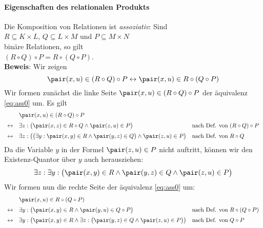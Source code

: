\paragraph{Eigenschaften des relationalen Produkts}
Die Komposition von Relationen ist \emph{assoziativ}:  Sind \\[0.2cm]
\hspace*{1.3cm} $R \subseteq K \times L$, \quad $Q \subseteq L \times M$ \quad und \quad 
                $P \subseteq M \times N$ \\[0.2cm]
bin\"{a}re Relationen, so gilt \\[0.2cm]
\hspace*{1.3cm} $(R \circ Q) \circ P = R \circ (Q \circ P)$. \\[0.2cm]
\textbf{Beweis}:  Wir zeigen
\begin{equation}
  \label{eq:ass0}
   \pair(x,u) \in (R \circ Q) \circ P \leftrightarrow \pair(x,u) \in R \circ (Q \circ P)   
\end{equation}
Wir formen zun\"{a}chst die linke Seite $\pair(x,u) \in (R \circ Q) \circ P$ der \"{a}quivalenz
\ref{eq:ass0} um.  Es gilt
\[
\begin{array}{cll}
                  & \pair(x,u) \in (R \circ Q) \circ P \\[0.2cm]
  \leftrightarrow & \exists z: \bigl(\pair(x,z) \in R \circ Q \wedge \pair(z,u) \in P\bigr) &
                    \mbox{nach Def. von}\; (R \circ Q) \circ P \\[0.2cm]
  \leftrightarrow & \exists z: \bigl(\bigl(\exists y: \pair(x,y) \in R \wedge \pair(y,z) \in Q\bigr) \wedge \pair(z,u) \in P\bigr) &
                    \mbox{nach Def. von}\; R \circ Q \\
\end{array}
\]
Da die Variable $y$ in der Formel $\pair(z,u) \in P$ nicht auftritt, k\"{o}nnen wir den
Existenz-Quantor \"{u}ber $y$ auch herausziehen:
\begin{equation}
  \label{eq:ass1}
  \exists z: \exists y: \bigl(\pair(x,y) \in R \wedge \pair(y,z) \in Q \wedge \pair(z,u) \in P\bigr)
\end{equation}
Wir formen nun die rechte Seite der \"{a}quivalenz
\ref{eq:ass0} um:
\[
\begin{array}{cll}
                & \pair(x,u) \in R \circ (Q \circ P) \\[0.2cm] 
\leftrightarrow & \exists y: \bigl(\pair(x,y) \in R \wedge \pair (y,u) \in Q \circ P\bigr) &
                  \mbox{nach Def. von}\; R \circ (Q \circ P) \\[0.2cm]
\leftrightarrow & \exists y: \bigl(\pair(x,y) \in R \wedge 
                  \exists z: \bigl(\pair(y,z) \in Q \wedge \pair(z,u) \in P\bigr)\bigr) &
                  \mbox{nach Def. von}\; Q \circ P \\
\end{array}
\]
